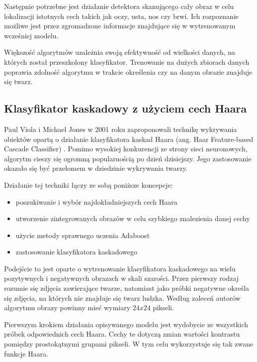 Następnie potrzebne jest działanie detektora skanującego cały obraz w celu lokalizacji istotnych cech takich jak oczy, usta, nos czy brwi. Ich rozpoznanie możliwe jest przez zgromadzone informacje znajdujące się w wytrenowanym wcześniej modelu.

Większość algorytmów uzależnia swoją efektywność od wielkości danych, na których został przeszkolony klasyfikator. Trenowanie na dużych zbiorach danych poprawia zdolność algorytmu w trakcie określenia czy na danym obrazie znajduje się twarz. \cite{fDetection}


\subsection{Klasyfikator kaskadowy z użyciem cech Haara}
\label{sub:Haar}
Paul Viola i Michael Jones w 2001 roku zaproponowali technikę wykrywania obiektów opartą o działanie klasyfikatora kaskad Haara (ang. Haar Feature-based Cascade Classifier) \cite{haar}. Pomimo wysokiej konkurencji ze strony sieci neuronowych, algorytm cieszy się ogromną popularnością po dzień dzisiejszy. Jego zastosowanie okazało się być przełomem w dziedzinie wykrywania twarzy. 

Działanie tej techniki łączy ze sobą poniższe koncepcje:
\begin{itemize}
    \item poszukiwanie i wybór najdokładniejszych cech Haara
    \item utworzenie zintegrowanych obrazów w celu szybkiego znalezienia danej cechy
    \item użycie metody sprawnego uczenia Adaboost
    \item zastosowanie klasyfikatora kaskadowego
\end{itemize}

Podejście to jest oparte o wytrenowanie klasyfikatora kaskadowego na wielu pozytywnych i negatywnych obrazach w skali szarości. Przez pierwszy rodzaj rozumie się zdjęcia zawierające twarze, natomiast jako próbki negatywne określa się zdjęcia, na których nie znajduje się twarz ludzka. Według zaleceń autorów algorytmu obrazy powinny mieć wymiary $24x24$ pikseli.

Pierwszym krokiem działania opisywanego modelu jest wydobycie ze wszystkich próbek odpowiednich cech Haara. Cechy te dotyczą zmian wartości kontrastu pomiędzy prostokątnymi grupami pikseli. W tym celu wykorzystuje się tak zwane funkcje Haara.

